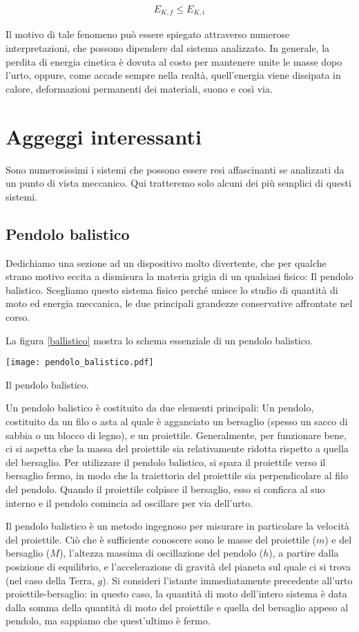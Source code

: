 \begin{align}
    E_{K,f} \leq E_{K,i}
\end{align}

\noindent Il motivo di tale fenomeno può essere spiegato attraverso numerose
interpretazioni, che possono dipendere dal sistema analizzato. In generale,
la perdita di energia cinetica è dovuta al costo per mantenere unite le
masse dopo l'urto, oppure, come accade sempre nella realtà, quell'energia
viene dissipata in calore, deformazioni permanenti dei materiali, suono e
così via.

\section{Aggeggi interessanti}
Sono numerosissimi i sistemi che possono essere resi affascinanti se
analizzati da un punto di vista meccanico. Qui tratteremo solo alcuni
dei più semplici di questi sistemi.

\subsection{Pendolo balistico}
Dedichiamo una sezione ad un dispositivo
molto divertente, che per qualche strano motivo eccita a dismisura la
materia grigia di un qualsiasi fisico: Il pendolo balistico. Scegliamo
questo sistema fisico perché unisce lo studio di quantità di moto ed
energia meccanica, le due principali grandezze conservative affrontate
nel corso.

La figura \ref{ballistico} mostra lo schema essenziale di un pendolo
balistico.
\begin{marginfigure}
    \centering
    \texttt{[image: pendolo\_balistico.pdf]}
    \caption{Il pendolo balistico.}
    \label{ballistico}
\end{marginfigure}
Un pendolo balistico è costituito da due elementi principali: Un
pendolo, costituito da un filo o asta al quale è agganciato un
bersaglio (spesso un sacco di sabbia o un blocco di legno),
e un proiettile. Generalmente, per funzionare bene, ci si aspetta
che la massa del proiettile sia relativamente ridotta rispetto a
quella del bersaglio. Per utilizzare il pendolo balistico, si
spara il proiettile verso il bersaglio fermo, in modo che la traiettoria
del proiettile sia perpendicolare al filo del pendolo. Quando il
proiettile colpisce il bersaglio, esso si conficca al suo interno
e il pendolo comincia ad oscillare per via dell'urto.

Il pendolo balistico è un metodo ingegnoso per misurare in
particolare la velocità del proiettile. Ciò che è sufficiente
conoscere sono le
masse del proiettile ($m$) e del bersaglio ($M$), l'altezza massima di
oscillazione del pendolo ($h$), a partire dalla posizione di equilibrio,
e l'accelerazione di gravità del pianeta
sul quale ci si trova (nel caso della Terra, $g$). Si consideri
l'istante immediatamente precedente all'urto proiettile-bersaglio:
in questo caso, la quantità di moto dell'intero sistema è data dalla
somma della quantità di moto del proiettile e quella del bersaglio
appeso al pendolo, ma sappiamo che quest'ultimo è fermo.


